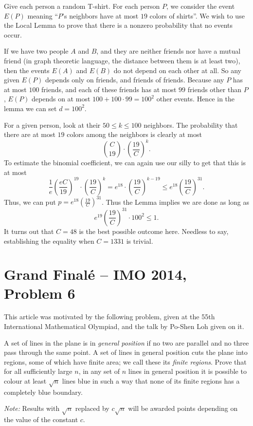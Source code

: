 \documentclass[11pt]{scrartcl}
\begin{document}
\begin{soln}
  Give each person a random T-shirt.
  For each person $P$, we consider the event $E(P)$ meaning ``$P$'s neighbors
  have at most $19$ colors of shirts''.
  We wish to use the Local Lemma to prove that there is a nonzero probability that no events occur.

  If we have two people $A$ and $B$,
  and they are neither friends nor have a mutual friend (in graph theoretic language,
  the distance between them is at least two),
  then the events $E(A)$ and $E(B)$ do not depend on each other at all.
  So any given $E(P)$ depends only on friends, and friends of friends.
  Because any $P$ has at most $100$ friends,
  and each of these friends has at most $99$ friends other than $P$,
  $E(P)$ depends on at most $100 + 100 \cdot 99 = 100^2$ other events.
  Hence in the lemma we can set $d = 100^2$.

  For a given person, look at their $50 \le k \le 100$ neighbors.
  The probability that there are at most $19$ colors among the neighbors is clearly at most
  \[ \binom{C}{19} \cdot \left( \frac{19}{C} \right)^k. \]
  To estimate the binomial coefficient,
  we can again use our silly  to get that this is at most
  \[ \frac 1e \left( \frac{eC}{19} \right)^{19}
    \cdot \left( \frac{19}{C} \right)^k
    = e^{18} \cdot \left( \frac{19}{C} \right)^{k-19}
    \le e^{18} \left( \frac{19}{C} \right)^{31}. \]
  Thus, we can put $p = e^{18} \left( \frac{19}{C} \right)^{31}$.
  Thus the Lemma implies we are done as long as
  \[ e^{19} \left( \frac{19}{C} \right)^{31} \cdot 100^2 \le 1. \]
  It turns out that $C=48$ is the best possible outcome here.
  Needless to say, establishing the equality when $C = 1331$ is trivial.
\end{soln}





\section{Grand Final\'e -- IMO 2014, Problem 6}
This article was motivated by the following problem,
given at the 55th International Mathematical Olympiad,
and the talk by Po-Shen Loh \cite{potalk} given on it.
\begin{example}
  [IMO 2014/6]
  A set of lines in the plane is in \emph{general position} if no two are
  parallel and no three pass through the same point.
  A set of lines in general position cuts the plane into regions, some of which have finite area;
  we call these its \emph{finite regions}.
  Prove that for all sufficiently large $n$,
  in any set of $n$ lines in general position it is possible to colour at least $\sqrt{n}$ lines blue
  in such a way that none of its finite regions has a completely blue boundary.

  \emph{Note:} Results with $\sqrt{n}$ replaced by $c\sqrt{n}$ will be awarded points depending on the value of the constant $c$.
\end{example}
\end{document}
